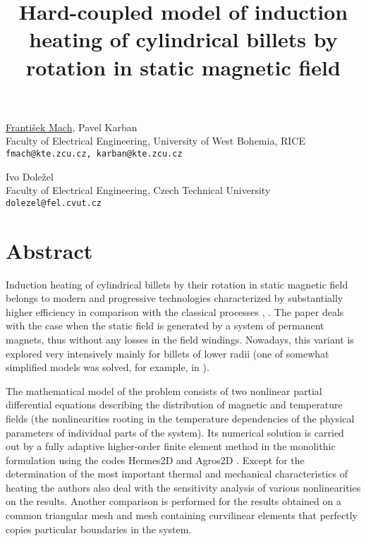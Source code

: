\title{Hard-coupled model of induction heating of cylindrical billets by rotation in static magnetic field}
\author{} \institute{}
\maketitle

\begin{center}
{\large \underline{Franti\v{s}ek Mach}, Pavel Karban}\\
Faculty of Electrical Engineering, University of West Bohemia, RICE\\
{\tt fmach@kte.zcu.cz, karban@kte.zcu.cz}\\
\vspace{4mm}

{\large Ivo Dole\v{z}el}\\
Faculty of Electrical Engineering, Czech Technical University\\
{\tt dolezel@fel.cvut.cz}
\end{center}

\section*{Abstract}
Induction heating of cylindrical billets by their rotation in static magnetic field belongs to modern and progressive technologies characterized by substantially higher efficiency in comparison with the classical processes \cite{mach1}, \cite{mach2}. The paper deals with the case when the static field is generated by a system of permanent magnets, thus without any losses in the field windings. Nowadays, this variant is explored very intensively mainly for billets of lower radii (one of somewhat simplified models was solved, for example, in \cite{mach3}).

The mathematical model of the problem consists of two nonlinear partial differential equations describing the distribution of magnetic and temperature fields (the nonlinearities rooting in the temperature dependencies of the physical parameters of individual parts of the system). Its numerical solution is carried out by a fully adaptive higher-order finite element method in the monolithic formulation using the codes Hermes2D and Agros2D \cite{mach4}. Except for the determination of the most important thermal and mechanical characteristics of heating the authors also deal with the sensitivity analysis of various nonlinearities on the results. Another comparison is performed for the results obtained on a common triangular mesh and mesh containing curvilinear elements that perfectly copies particular boundaries in the system.

